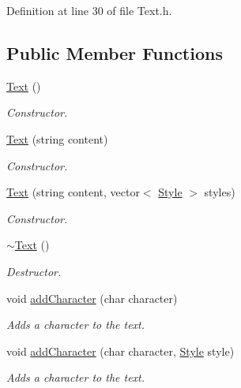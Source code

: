 Definition at line 30 of file Text.h.\subsection*{Public Member Functions}
\begin{CompactItemize}
\item 
\hyperlink{class_text_b3e26143fccc52699bcc5149cae852bc}{Text} ()
\begin{CompactList}\small\item\em Constructor. \item\end{CompactList}\item 
\hyperlink{class_text_36e53196a53aa8dc7c1de3018d8f0b6d}{Text} (string content)
\begin{CompactList}\small\item\em Constructor. \item\end{CompactList}\item 
\hyperlink{class_text_1016494333aa62e305ec52f587f1cb66}{Text} (string content, vector$<$ \hyperlink{class_style}{Style} $>$ styles)
\begin{CompactList}\small\item\em Constructor. \item\end{CompactList}\item 
\hyperlink{class_text_2d49e5c280e205125b149f7777ae30c7}{$\sim$Text} ()
\begin{CompactList}\small\item\em Destructor. \item\end{CompactList}\item 
void \hyperlink{class_text_f30df66d8aa08a4e202512a358534f6c}{addCharacter} (char character)
\begin{CompactList}\small\item\em Adds a character to the text. \item\end{CompactList}\item 
void \hyperlink{class_text_757b9caa67089198ac99c06391b910bb}{addCharacter} (char character, \hyperlink{class_style}{Style} style)
\begin{CompactList}\small\item\em Adds a character to the text. \item\end{CompactList}\item 

\end{CompactItemize}
